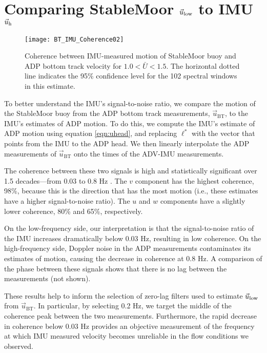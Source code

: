 \section{Comparing StableMoor $\vec{u}_\mathrm{low}$ to IMU $\vec{u}_\mathrm{h}$}
\label{apdx:ulow}

\def\ubt{\ensuremath{\vec{u}_\mathrm{BT}}}

\begin{figure}[t]
  \centering
  \texttt{[image: BT\_IMU\_Coherence02]}
  \caption{Coherence between IMU-measured motion of StableMoor buoy and ADP bottom track velocity for $1.0<\bar{U}<1.5$. The horizontal dotted line indicates the 95\% confidence level for the 102 spectral windows in this estimate.}
  \label{fig:SM_coh}
\end{figure}
To better understand the IMU's signal-to-noise ratio, we compare the motion of the StableMoor buoy from the ADP bottom track measurements, $\ubt$, to the IMU's estimates of ADP motion. To do this, we compute the IMU's estimate of ADP motion using equation \eqref{eqn:uhead}, and replacing $\ell^{*}$ with the vector that points from the IMU to the ADP head. We then linearly interpolate the ADP measurements of $\ubt$ onto the times of the ADV-IMU measurements.

The coherence between these two signals is high and statistically significant over 1.5 decades---from 0.03 to 0.8 Hz \cite[][]{Priestley1981}. The $v$ component has the highest coherence, 98\%, because this is the direction that has the most motion (i.e., these estimates have a higher signal-to-noise ratio).  The $u$ and $w$ components have a slightly lower coherence, 80\% and 65\%, respectively.

On the low-frequency side, our interpretation is that the signal-to-noise ratio of the IMU increases dramatically below 0.03 Hz, resulting in low coherence. On the high-frequency side, Doppler noise in the ADP measurements contaminates its estimates of motion, causing the decrease in coherence at 0.8 Hz. A comparison of the phase between these signals shows that there is no lag between the measurements (not shown).


These results help to inform the selection of zero-lag filters used to estimate $\vec{u}_\mathrm{low}$ from $\ubt$. In particular, by selecting 0.2 Hz, we target the middle of the coherence peak between the two measurements. Furthermore, the rapid decrease in coherence below 0.03 Hz provides an objective measurement of the frequency at which IMU measured velocity becomes unreliable in the flow conditions we observed. 



